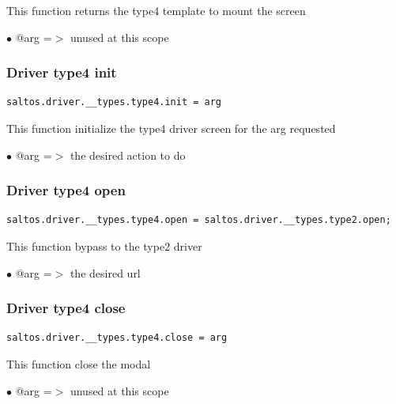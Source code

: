 \documentclass[a4paper]{article}
\begin{document}
This function returns the type4 template to mount the screen

\begin{compactitem}
\item[\color{myblue}$\bullet$] @arg =$>$ unused at this scope
\end{compactitem}

\hypertarget{toc198}{}
\subsubsection{Driver type4 init}

\begin{lstlisting}
saltos.driver.__types.type4.init = arg
\end{lstlisting}

This function initialize the type4 driver screen for the arg requested

\begin{compactitem}
\item[\color{myblue}$\bullet$] @arg =$>$ the desired action to do
\end{compactitem}

\hypertarget{toc199}{}
\subsubsection{Driver type4 open}

\begin{lstlisting}
saltos.driver.__types.type4.open = saltos.driver.__types.type2.open;
\end{lstlisting}

This function bypass to the type2 driver

\begin{compactitem}
\item[\color{myblue}$\bullet$] @arg =$>$ the desired url
\end{compactitem}

\hypertarget{toc200}{}
\subsubsection{Driver type4 close}

\begin{lstlisting}
saltos.driver.__types.type4.close = arg
\end{lstlisting}

This function close the modal

\begin{compactitem}
\item[\color{myblue}$\bullet$] @arg =$>$ unused at this scope
\end{compactitem}
\end{document}
